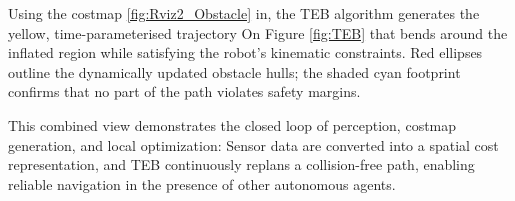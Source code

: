 Using the costmap \ref{fig:Rviz2_Obstacle} in, the TEB algorithm generates the yellow, time-parameterised trajectory On Figure \ref{fig:TEB} that bends around the inflated region while satisfying the robot’s kinematic constraints.
Red ellipses outline the dynamically updated obstacle hulls; the shaded cyan footprint confirms that no
part of the path violates safety margins.

This combined view demonstrates the closed loop of perception, costmap generation, and local
optimization: Sensor data are converted into a spatial cost representation, and TEB continuously replans a
collision-free path, enabling reliable navigation in the presence of other autonomous agents.